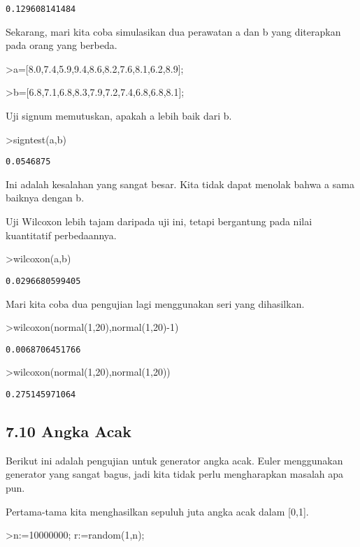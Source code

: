 \documentclass[
]{book}
\begin{document}
\begin{verbatim}
0.129608141484
\end{verbatim}

Sekarang, mari kita coba simulasikan dua perawatan a dan b yang diterapkan pada orang yang berbeda.

\textgreater a={[}8.0,7.4,5.9,9.4,8.6,8.2,7.6,8.1,6.2,8.9{]};

\textgreater b={[}6.8,7.1,6.8,8.3,7.9,7.2,7.4,6.8,6.8,8.1{]};

Uji signum memutuskan, apakah a lebih baik dari b.

\textgreater signtest(a,b)

\begin{verbatim}
0.0546875
\end{verbatim}

Ini adalah kesalahan yang sangat besar. Kita tidak dapat menolak bahwa a sama baiknya dengan b.

Uji Wilcoxon lebih tajam daripada uji ini, tetapi bergantung pada nilai kuantitatif perbedaannya.

\textgreater wilcoxon(a,b)

\begin{verbatim}
0.0296680599405
\end{verbatim}

Mari kita coba dua pengujian lagi menggunakan seri yang dihasilkan.

\textgreater wilcoxon(normal(1,20),normal(1,20)-1)

\begin{verbatim}
0.0068706451766
\end{verbatim}

\textgreater wilcoxon(normal(1,20),normal(1,20))

\begin{verbatim}
0.275145971064
\end{verbatim}

\subsection{7.10 Angka Acak}\label{angka-acak}

Berikut ini adalah pengujian untuk generator angka acak. Euler menggunakan generator yang sangat bagus, jadi kita tidak perlu mengharapkan masalah apa pun.

Pertama-tama kita menghasilkan sepuluh juta angka acak dalam {[}0,1{]}.

\textgreater n:=10000000; r:=random(1,n);
\end{document}
